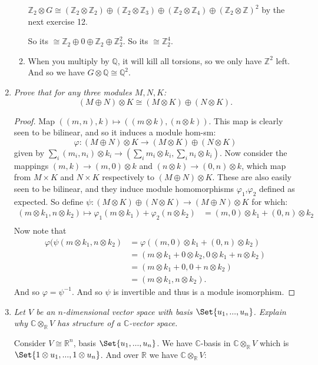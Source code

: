 \documentclass[9pt,reqno,twoside]{amsbook}
\theoremstyle{plain}
\numberwithin{section}{chapter}
\numberwithin{equation}{chapter}
\theoremstyle{definition}
\theoremstyle{remark}
\theoremstyle{plain}
\newcommand{\R}{\mathbb{R}}
\newcommand{\z}{\mathbb{Z}}
\newcommand{\Q}{\mathbb{Q}}
\renewcommand{\c}{\mathbb{C}}
\newcommand{\bee}{\begin{equation}\begin{aligned}}
\newcommand{\eee}{\end{aligned}\end{equation}}
\newcommand{\tens}{\otimes}
\renewcommand{\phi}{\varphi}
\begin{document}
\begin{enumerate}[label=\arabic*.]
\begin{enumerate}
$\z_2 \tens G \cong (\z_2 \tens \z_2) \oplus (\z_2 \tens \z_3) \oplus (\z_2 \tens \z_4) \oplus (\z_2 \tens \z)^2$ by the next exercise 12. 

So its $\cong \z_2 \oplus 0 \oplus \z_2 \oplus \z_2^2$. So its $\cong \z_2^4$. 

\item

When you multiply by $\Q$, it will kill all torsions, so we only have $\z^2$ left. And so we have $G \tens \Q \cong \Q^2$. 
\end{enumerate}

\item \textit{Prove that for any three modules $M,N,K$:
$$
(M \oplus N) \tens K \cong (M \tens K) \oplus (N \tens K).
$$ }

\begin{proof}
Map $((m,n),k) \mapsto ((m \tens k) ,(n \tens k))$. This map is clearly seen to be bilinear, and so it induces a module hom-sm:
 $$
 \phi:(M \oplus N) \tens K \to (M \tens K) \oplus (N \tens K)
 $$
 given by $\sum_i(m_i,n_i) \tens k_i \to (\sum_i m_i \tens k_i,\sum_i n_i \tens k_i)$. Now consider the mappings $(m,k) \to (m,0) \tens k$ and $(n \tens k) \to (0,n) \tens k$, which map from $M \times K$ and $N \times K$ respectively to $(M \oplus N) \tens K$. These are also easily seen to be bilinear, and they induce module homomorphisms $\phi_1$,$\phi_2$ defined as expected. So define $\psi:(M \tens K) \oplus (N \tens K) \to (M \oplus N) \tens K$ for which:
 \bee
( m \tens k_1,n \tens k_2) \mapsto \phi_1(m \tens k_1) + \phi_2(n \tens k_2)& = (m,0) \tens k_1 + (0,n) \tens k_2\\
 \eee
 Now note that 
 \bee
 \phi(\psi(m \tens k_1,n \tens k_2) &= \phi((m,0) \tens k_1 + (0,n) \tens k_2)\\
 &= (m \tens k_1 + 0 \tens k_2,0 \tens k_1 + n \tens k_2)\\
 &= (m \tens k_1 + 0,0 + n \tens k_2)\\
 &= (m \tens k_1,n \tens k_2).
 \eee
 And so $\phi = \psi^{-1}$. And so $\psi$ is invertible and thus is a module isomorphism. 
\end{proof}


\item \textit{Let $V$ be an $n$-dimensional vector space with basis $\Set{u_1,...,u_n}$. Explain why $\c \tens_\R V$ has structure of a $\c$-vector space. }

Consider $V \cong \R^n$, basis $\Set{u_1,...,u_n}$. We have $\c$-basis in $\c \tens_\R V$ which is $\Set{1 \tens u_1,...,1 \tens u_n}$. And over $\R$ we have 
$\c \tens_\R V$: 


\end{enumerate}
\end{document}
